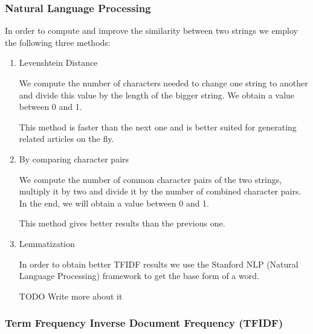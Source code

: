 \subsubsection{Natural Language Processing}
\label{sec:natural-language-processing}
In order to compute and improve the similarity between two strings we employ the following three methods:
\begin{enumerate}
	\item Levenshtein Distance

		We compute the number of characters needed to change one string to another and divide this value by the length of the bigger string. We obtain a value between 0 and 1.
		
		This method is faster than the next one and is better suited for generating related articles on the fly.

	\item By comparing character pairs
	
		We compute the number of common character pairs of the two strings, multiply it by two and divide it by the number of combined character pairs. In the end, we will obtain a value between 0 and 1.
		
		This method gives better results than the previous one.
	\item Lemmatization

		In order to obtain better TFIDF results we use the Stanford NLP (Natural Language Processing) framework to get the base form of a word.
		
		TODO Write more about it
\end{enumerate}

\subsubsection{Term Frequency Inverse Document Frequency (TFIDF)}
\label{sec:TFIDF}

